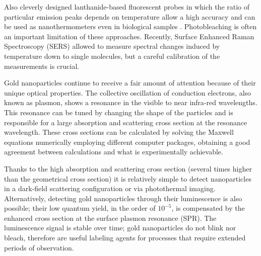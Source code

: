 \documentclass[journal=nalefd,manuscript=letter]{achemso}
\begin{document}
Also cleverly designed lanthanide-based fluorescent probes in which the ratio of
particular emission peaks depends on temperature allow a high accuracy and can
be used as nanothermometers \cite{liu2016ratiometric} even in biological samples
\cite{Vetrone2010}. Photobleaching is often an important limitation of these
approaches. Recently, Surface Enhanced Raman Spectroscopy (SERS) allowed to
measure spectral changes induced by temperature down to single
molecules\cite{Pozzi2015}, but a careful calibration of the measurements is
crucial.

Gold nanoparticles continue to receive a fair amount of attention because of
their unique optical properties\cite{Zijlstra2011}. The collective oscillation
of conduction electrons, also known as plasmon, shows a resonance in the visible to
near infra-red wavelengths. This resonance can be tuned by changing the shape of
the particles\cite{Carattino2016} and is responsible for a large absorption
and scattering cross section at the resonance wavelength. These cross sections can
be calculated by solving the Maxwell equations numerically employing different computer
packages\cite{Draine1994,Yurkin2011,Oskooi2010}, obtaining a good agreement
between calculations and what is experimentally achievable. 

Thanks to the high absorption and scattering cross section (several times higher
than the geometrical cross section) it is relatively simple to detect
nanoparticles in a dark-field scattering configuration\cite{Hu2008} or via
photothermal imaging\cite{boyer2002photothermal, Berciaud2006}.
Alternatively, detecting gold nanoparticles through their
luminescence\cite{Tcherniak2011} is also possible; their low quantum
yield\cite{Fang2012,Rao2015,Yorulmaz2012,Cheng2015}, in the order of $10^{-5}$,
is compensated by the enhanced cross section at the surface plasmon resonance
(SPR). The luminescence signal is stable over time; gold nanoparticles do not
blink nor bleach, therefore are useful labeling agents for processes that
require extended periods of observation\cite{Wang2005}.
\end{document}
